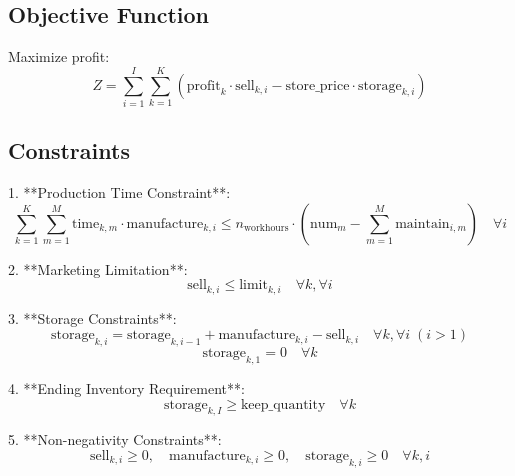 \documentclass{article}
\begin{document}
\subsection*{Objective Function}
Maximize profit:
\[
Z = \sum_{i=1}^{I} \sum_{k=1}^{K} \left( \text{profit}_k \cdot \text{sell}_{k, i} - \text{store\_price} \cdot \text{storage}_{k, i} \right)
\]

\subsection*{Constraints}
1. **Production Time Constraint**:
   \[
   \sum_{k=1}^{K} \sum_{m=1}^{M} \text{time}_{k, m} \cdot \text{manufacture}_{k, i} \leq n_{\text{workhours}} \cdot \left( \text{num}_m - \sum_{m=1}^{M} \text{maintain}_{i, m} \right) \quad \forall i
   \]

2. **Marketing Limitation**:
   \[
   \text{sell}_{k, i} \leq \text{limit}_{k, i} \quad \forall k, \forall i
   \]

3. **Storage Constraints**:
   \[
   \text{storage}_{k, i} = \text{storage}_{k, i-1} + \text{manufacture}_{k, i} - \text{sell}_{k, i} \quad \forall k, \forall i \; (i > 1)
   \]
   \[
   \text{storage}_{k, 1} = 0 \quad \forall k
   \]

4. **Ending Inventory Requirement**:
   \[
   \text{storage}_{k, I} \geq \text{keep\_quantity} \quad \forall k
   \]

5. **Non-negativity Constraints**:
   \[
   \text{sell}_{k, i} \geq 0, \quad \text{manufacture}_{k, i} \geq 0, \quad \text{storage}_{k, i} \geq 0 \quad \forall k, i
   \]
\end{document}

